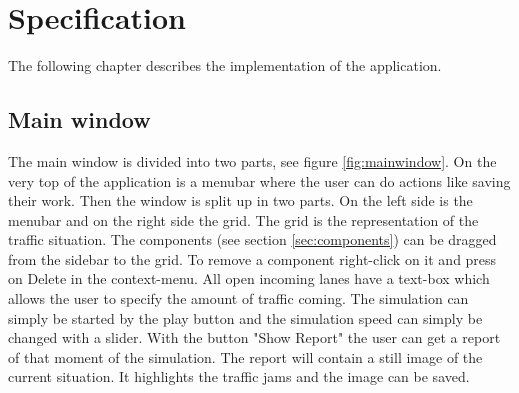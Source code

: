 \section{Specification}
The following chapter describes the implementation of the application.
\subsection{Main window}
The main window is divided into two parts, see figure \ref{fig:mainwindow}. On the very top of the application is a menubar where the user can do actions like saving their work. Then the window is split up in two parts. On the left side is the menubar and on the right side the grid. The grid is the representation of the traffic situation. The components (see section \ref{sec:components}) can be dragged from the sidebar to the grid. To remove a component right-click on it and press on Delete in the context-menu. All open incoming lanes have a text-box which allows the user to specify the amount of traffic coming. The simulation can simply be started by the play button and the simulation speed can simply be changed with a slider. With the button "Show Report" the user can get a report of that moment of the simulation. The report will contain a still image of the current situation. It highlights the traffic jams and the image can be saved.

